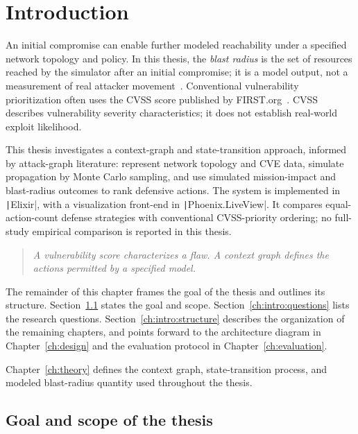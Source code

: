 \chapter{Introduction}
\label{ch:introduction}

An initial compromise can enable further modeled reachability under a specified network topology and policy. In this thesis, the \emph{blast radius} is the set of resources reached by the simulator after an initial compromise; it is a model output, not a measurement of real attacker movement~\cite{ou05mulval}. Conventional vulnerability prioritization often uses the CVSS score published by FIRST.org~\cite{cvss31}. CVSS describes vulnerability severity characteristics; it does not establish real-world exploit likelihood.

This thesis investigates a context-graph and state-transition approach, informed by attack-graph literature: represent network topology and CVE data, simulate propagation by Monte Carlo sampling, and use simulated mission-impact and blast-radius outcomes to rank defensive actions. The system is implemented in \texttt|Elixir|, with a visualization front-end in \texttt|Phoenix.LiveView|. It compares equal-action-count defense strategies with conventional CVSS-priority ordering; no full-study empirical comparison is reported in this thesis.

\begin{quote}
	\itshape A vulnerability score characterizes a flaw. A context graph defines the actions permitted by a specified model.
\end{quote}

The remainder of this chapter frames the goal of the thesis and outlines its structure. Section~\ref{ch:intro:goal} states the goal and scope. Section~\ref{ch:intro:questions} lists the research questions. Section~\ref{ch:intro:structure} describes the organization of the remaining chapters, and points forward to the architecture diagram in Chapter~\ref{ch:design} and the evaluation protocol in Chapter~\ref{ch:evaluation}.

Chapter~\ref{ch:theory} defines the context graph, state-transition process, and modeled blast-radius quantity used throughout the thesis.

\section{Goal and scope of the thesis}
\label{ch:intro:goal}

